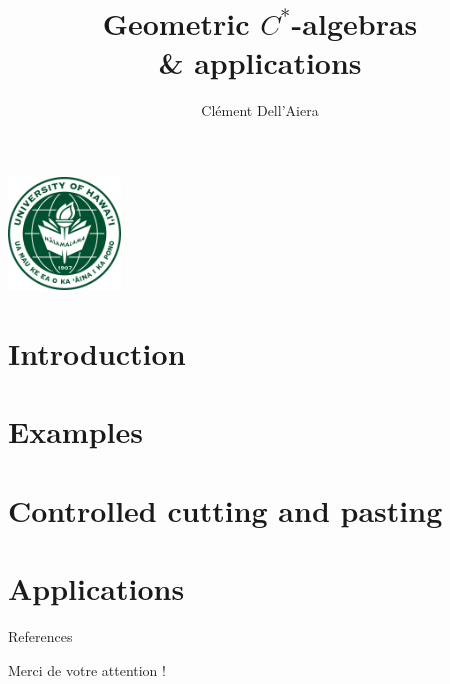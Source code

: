 \documentclass{beamer}
\title[First Steps with SCRATCH]{Geometric $C^*$-algebras\\ \& applications}
\author{Clément Dell'Aiera}
\institute{University of Hawaii at Manoa}
\date{}
\begin{document}
\begin{frame}
\titlepage
\begin{center} \includegraphics[width=3cm]{UH_logo.png}\end{center}
\end{frame}

\begin{frame}
  \tableofcontents\end{frame}

\section{Introduction}


\section{Examples}
\begin{frame}
  \tableofcontents[currentsection]
\end{frame}


\section{Controlled cutting and pasting}
\begin{frame}
  \tableofcontents[currentsection]
\end{frame}


\section{Applications}
\begin{frame}
  \tableofcontents[currentsection]
\end{frame}


%
%
\footnotesize
\begin{frame}{References}


\end{frame} 

\Large
\begin{frame}{}
Merci de votre attention !
\end{frame}
\end{document}
